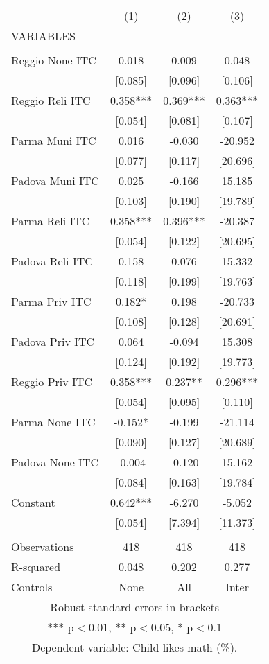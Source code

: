 \begin{tabular}{lccc} \hline
 & (1) & (2) & (3) \\
VARIABLES &  &  &  \\ \hline
 &  &  &  \\
Reggio None ITC & 0.018 & 0.009 & 0.048 \\
 & [0.085] & [0.096] & [0.106] \\
Reggio Reli ITC & 0.358*** & 0.369*** & 0.363*** \\
 & [0.054] & [0.081] & [0.107] \\
Parma Muni ITC & 0.016 & -0.030 & -20.952 \\
 & [0.077] & [0.117] & [20.696] \\
Padova Muni ITC & 0.025 & -0.166 & 15.185 \\
 & [0.103] & [0.190] & [19.789] \\
Parma Reli ITC & 0.358*** & 0.396*** & -20.387 \\
 & [0.054] & [0.122] & [20.695] \\
Padova Reli ITC & 0.158 & 0.076 & 15.332 \\
 & [0.118] & [0.199] & [19.763] \\
Parma Priv ITC & 0.182* & 0.198 & -20.733 \\
 & [0.108] & [0.128] & [20.691] \\
Padova Priv ITC & 0.064 & -0.094 & 15.308 \\
 & [0.124] & [0.192] & [19.773] \\
Reggio Priv ITC & 0.358*** & 0.237** & 0.296*** \\
 & [0.054] & [0.095] & [0.110] \\
Parma None ITC & -0.152* & -0.199 & -21.114 \\
 & [0.090] & [0.127] & [20.689] \\
Padova None ITC & -0.004 & -0.120 & 15.162 \\
 & [0.084] & [0.163] & [19.784] \\
Constant & 0.642*** & -6.270 & -5.052 \\
 & [0.054] & [7.394] & [11.373] \\
 &  &  &  \\
Observations & 418 & 418 & 418 \\
R-squared & 0.048 & 0.202 & 0.277 \\
 Controls & None & All & Inter \\ \hline
\multicolumn{4}{c}{ Robust standard errors in brackets} \\
\multicolumn{4}{c}{ *** p$<$0.01, ** p$<$0.05, * p$<$0.1} \\
\multicolumn{4}{c}{ Dependent variable: Child likes math (\%).} \\
\end{tabular}
